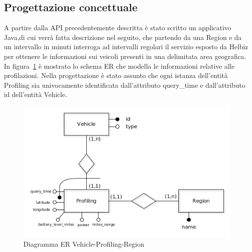 \inputminted[bgcolor=lightgray]{json}{vehicles.json}

\subsection{Progettazione concettuale}

A partire dalla API precedentemente descritta è stato scritto un applicativo Java,di cui
verrà fatta descrizione nel seguito, che partendo da una Region e da un intervallo in
minuti interroga ad intervalli regolari il servizio esposto da Helbiz per ottenere le
informazioni sui veicoli presenti in una delimitata area geografica.
In figura~\ref{fig:vehicle_profiling_er} è mostrato lo schema ER che modella le informazioni
relative alle profilazioni. Nella progettazione è stato assunto che ogni istanza
dell'entità Profiling sia univocamente identificata dall'attributo query\_time e
dall'attributo id dell'entità Vehicle.

\begin{figure}[H]                                                                                                                                                            
\centering                                                                                                                                                                   
\includegraphics[width=\textwidth]{diagrams/vehicle_profiling_er}                                                                                                                                   
\caption{Diagramma ER Vehicle-Profiling-Region}                                                                                                                                            
\label{fig:vehicle_profiling_er}                                                                                                                                                           
\end{figure}

